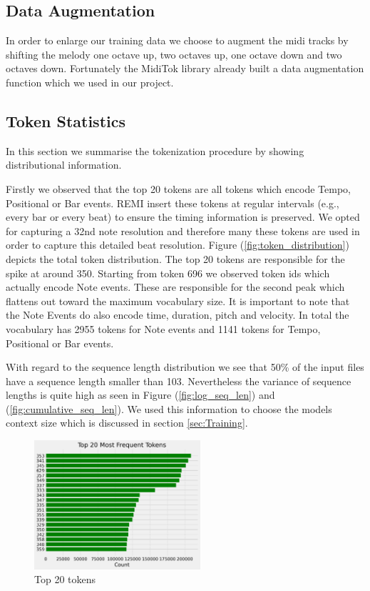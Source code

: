 \documentclass[a4paper,12pt]{extarticle}
\begin{document}
\subsection{Data Augmentation}
In order to enlarge our training data we choose to augment the midi tracks by shifting the melody one octave up, two octaves up, one octave down and two octaves down. Fortunately the MidiTok library already built a data augmentation function which we used in our project.
\subsection{Token Statistics}
\label{sec:token_stats}
In this section we summarise the tokenization procedure by showing distributional information. \newline

Firstly we observed that the top 20 tokens are all tokens which encode Tempo, Positional or Bar events.
REMI insert these tokens at regular intervals (e.g., every bar or every beat) to ensure the timing information is preserved.
We opted for capturing a 32nd note resolution and therefore many these tokens are used in order to capture this detailed beat resolution.
Figure (\ref{fig:token_distribution}) depicts the total token distribution. The top 20 tokens are responsible for the spike at around 350. Starting from token 696 we observed token ids which actually encode Note events. These are responsible for the second peak which flattens out toward the maximum vocabulary size.
It is important to note that the Note Events do also encode time, duration, pitch and velocity. In total the vocabulary has 2955 tokens for Note events and 1141 tokens for Tempo, Positional
or Bar events.

With regard to the sequence length distribution we see that 50\% of the input files have a sequence length smaller than 103.
Nevertheless the variance of sequence lengths is quite high as seen in Figure (\ref{fig:log_seq_len}) and (\ref{fig:cumulative_seq_len}). We used this information to choose the models context size which is discussed in section \ref{sec:Training}. \newline
\begin{figure}[H]
    \centering
    \includegraphics[width=0.55\textwidth]{visualization_4096_REMI_train_manual_tokens_True_random_padding_True_top_frequent_tokens.png}
    \caption{Top 20 tokens}
    \label{fig:top_20_tokens}
\end{figure}
\end{document}
